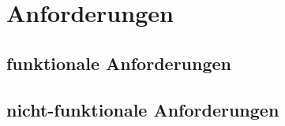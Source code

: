 \chapter{Anforderungen}
\label{cha:anforderungen}


\section{funktionale Anforderungen}
\label{sec:funtionaleanforderungen}


\section{nicht-funktionale Anforderungen}
\label{sec:nichtfunktionaleanforderungen}

